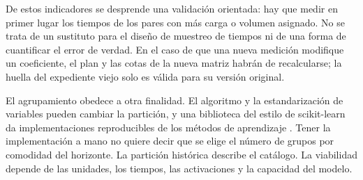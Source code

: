 De estos indicadores se desprende una validación orientada: hay que medir en primer lugar los tiempos de los pares con más carga o volumen asignado. No se trata de un sustituto para el diseño de muestreo de tiempos ni de una forma de cuantificar el error de verdad. En el caso de que una nueva medición modifique un coeficiente, el plan y las cotas de la nueva matriz habrán de recalcularse; la huella del expediente viejo solo es válida para su versión original.

El agrupamiento obedece a otra finalidad. El algoritmo y la estandarización de variables pueden cambiar la partición, y una biblioteca del estilo de scikit-learn da implementaciones reproducibles de los métodos de aprendizaje \cite{pedregosa}. Tener la implementación a mano no quiere decir que se elige el número de grupos por comodidad del horizonte. La partición histórica describe el catálogo. La viabilidad depende de las unidades, los tiempos, las activaciones y la capacidad del modelo.
